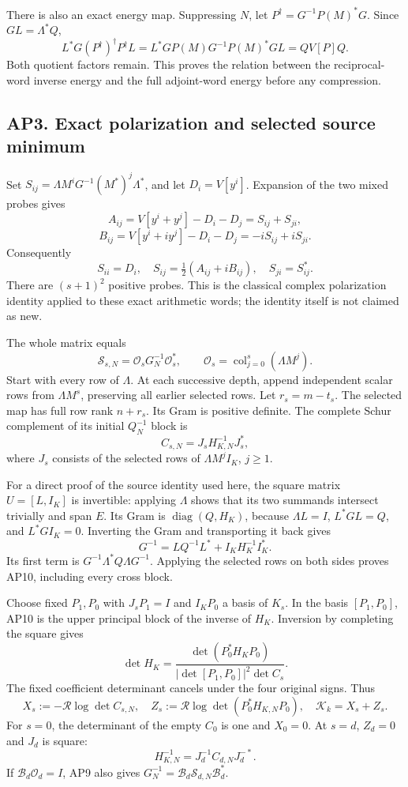 \documentclass[11pt]{article}
\begin{document}
There is also an exact energy map. Suppressing \(N\), let \(P^\dagger=G^{-1}P(M)^*G\). Since \(GL=\Lambda^*Q\), \[
 L^*G(P^\dagger)^\dagger P^\dagger L
 =L^*GP(M)G^{-1}P(M)^*GL
 =QV[P]Q. \tag{AP7}
\] Both quotient factors remain. This proves the relation between the reciprocal-word inverse energy and the full adjoint-word energy before any compression.

\subsection{AP3. Exact polarization and selected source minimum}\label{ap3.-exact-polarization-and-selected-source-minimum}

Set \(S_{ij}=\Lambda M^iG^{-1}(M^*)^j\Lambda^*\), and let \(D_i=V[y^i]\). Expansion of the two mixed probes gives \[
 A_{ij}=V[y^i+y^j]-D_i-D_j=S_{ij}+S_{ji},
\] \[
 B_{ij}=V[y^i+iy^j]-D_i-D_j=-iS_{ij}+iS_{ji}.
\] Consequently \[
 S_{ii}=D_i,\quad S_{ij}=\tfrac12(A_{ij}+iB_{ij}),\quad S_{ji}=S_{ij}^*.
 \tag{AP8}
\] There are \((s+1)^2\) positive probes. This is the classical complex polarization identity applied to these exact arithmetic words; the identity itself is not claimed as new.

The whole matrix equals \[
 \mathcal S_{s,N}=\mathcal O_sG_N^{-1}\mathcal O_s^*,
 \qquad\mathcal O_s=\operatorname{col}_{j=0}^s(\Lambda M^j). \tag{AP9}
\] Start with every row of \(\Lambda\). At each successive depth, append independent scalar rows from \(\Lambda M^s\), preserving all earlier selected rows. Let \(r_s=m-t_s\). The selected map has full row rank \(n+r_s\). Its Gram is positive definite. The complete Schur complement of its initial \(Q_N^{-1}\) block is \[
 C_{s,N}=J_s H_{K,N}^{-1}J_s^*, \tag{AP10}
\] where \(J_s\) consists of the selected rows of \(\Lambda M^jI_K\), \(j\ge1\).

For a direct proof of the source identity used here, the square matrix \(U=[L,I_K]\) is invertible: applying \(\Lambda\) shows that its two summands intersect trivially and span \(E\). Its Gram is \(\operatorname{diag}(Q,H_K)\), because \(\Lambda L=I\), \(L^*GL=Q\), and \(L^*GI_K=0\). Inverting the Gram and transporting it back gives \[
 G^{-1}=LQ^{-1}L^*+I_KH_K^{-1}I_K^*.
\] Its first term is \(G^{-1}\Lambda^*Q\Lambda G^{-1}\). Applying the selected rows on both sides proves AP10, including every cross block.

Choose fixed \(P_1,P_0\) with \(J_sP_1=I\) and \(I_KP_0\) a basis of \(K_s\). In the basis \([P_1,P_0]\), AP10 is the upper principal block of the inverse of \(H_K\). Inversion by completing the square gives \[
 \det H_K
 =\frac{\det(P_0^*H_KP_0)}{|\det[P_1,P_0]|^2\det C_s}.
\] The fixed coefficient determinant cancels under the four original signs. Thus \[
 X_s:=-\mathcal R\log\det C_{s,N},\quad
 Z_s:=\mathcal R\log\det(P_0^*H_{K,N}P_0),\quad
 \mathcal K_k=X_s+Z_s. \tag{AP11}
\] For \(s=0\), the determinant of the empty \(C_0\) is one and \(X_0=0\). At \(s=d\), \(Z_d=0\) and \(J_d\) is square: \[
 H_{K,N}^{-1}=J_d^{-1}C_{d,N}J_d^{-*}. \tag{AP12}
\] If \(\mathcal B_d\mathcal O_d=I\), AP9 also gives \(G_N^{-1}=\mathcal B_d\mathcal S_{d,N}\mathcal B_d^*\).
\end{document}
